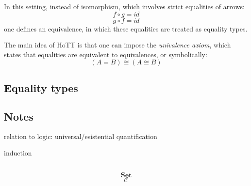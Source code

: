 \documentclass[DaoFP]{subfiles}
\begin{document}
In this setting, instead of isomorphism, which involves strict equalities of arrows:
\[ f \circ g = id \]
\[ g \circ f = id \]
one defines an equivalence, in which these equalities are treated as equality types.

The main idea of HoTT is that one can impose the \emph{univalence axiom}, which states that equalities are equivalent to equivalences, or symbolically:
\[ (A = B) \cong (A \cong B) \]

\subsection{Equality types}

\subsection{Notes}


relation to logic: universal/esistential quantification


induction

\begin{exercise}
\end{exercise}

\begin{haskell}
\end{haskell}

\[
 \begin{tikzcd}
  \end{tikzcd}
\]

\[   \mathbf{Set} \]
\[   \mathcal{C} \]
\end{document}
